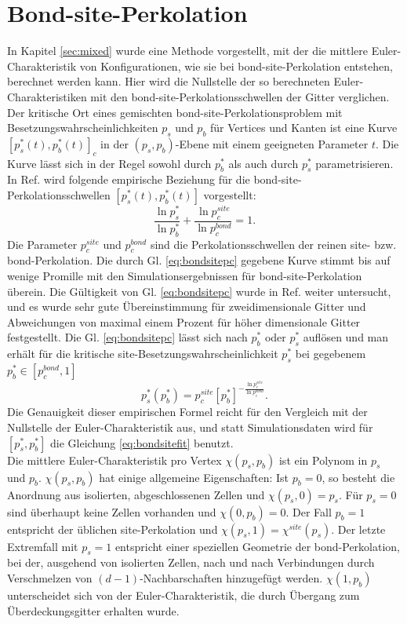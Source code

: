 \section{Bond-site-Perkolation}
In Kapitel \ref{sec:mixed} wurde eine Methode vorgestellt, mit der die mittlere Euler-Charakteristik von Konfigurationen, wie sie bei bond-site-Perkolation entstehen, berechnet werden kann. Hier wird die Nullstelle der so berechneten Euler-Charakteristiken mit den bond-site-Perkolationsschwellen der Gitter verglichen.
\\Der kritische Ort eines gemischten bond-site-Perkolationsproblem mit Besetzungswahrscheinlichkeiten $p_s$ und $p_b$ f\"ur Vertices und Kanten ist eine Kurve $[p_s^*(t),p_b^*(t)]_c$ in der $(p_s,p_b)$-Ebene mit einem geeigneten Parameter $t$. Die Kurve l\"asst sich in der Regel sowohl durch $p_b^*$ als auch durch $p_s^*$ parametrisieren. In Ref. \cite{Yanuka:90} wird folgende empirische Beziehung f\"ur die bond-site-Perkolationsschwellen $[p_s^*(t),p_b^*(t)]$ vorgestellt:
\begin{equation}
\label{eq:bondsitepc}
  \frac{\ln p^*_s}{\ln p^*_b}+\frac{\ln p_c^{site}}{\ln p_c^{bond}}=1.
\end{equation}
Die Parameter $p_c^{site}$ und $p_c^{bond}$ sind die Perkolationsschwellen der reinen site- bzw. bond-Perkolation. Die durch Gl. \ref{eq:bondsitepc} gegebene Kurve stimmt bis auf wenige Promille mit den Simulationsergebnissen f\"ur bond-site-Perkolation \"uberein. Die G\"ultigkeit von Gl. \ref{eq:bondsitepc} wurde in Ref. \cite{Tarasevich:99} weiter untersucht, und es wurde sehr gute \"Ubereinstimmung f\"ur zweidimensionale Gitter und Abweichungen von maximal einem Prozent f\"ur h\"oher dimensionale Gitter festgestellt. Die Gl. \ref{eq:bondsitepc} l\"asst sich nach $p^*_b$ oder $p^*_s$ aufl\"osen und man erh\"alt f\"ur die kritische site-Besetzungswahrscheinlichkeit $p^*_s$ bei gegebenem $p_b^*\in [p_c^{bond},1]$
\begin{equation}
\label{eq:bondsitefit}
p^*_s\left(p^*_b\right)=p_c^{site}\left[p^*_b\right]^{-\frac{\ln p_c^{site}}{\ln p_c^{bond}}}.
\end{equation}
Die Genauigkeit dieser empirischen Formel reicht f\"ur den Vergleich mit der Nullstelle der Euler-Charakteristik aus, und statt Simulationsdaten wird f\"ur $[p^*_s,p^*_b]$ die Gleichung \ref{eq:bondsitefit} benutzt.\\
Die mittlere Euler-Charakteristik pro Vertex $\chi(p_s,p_b)$ ist ein Polynom in $p_s$ und $p_b$. $\chi(p_s,p_b)$ hat einige allgemeine Eigenschaften: Ist $p_b=0$, so besteht die Anordnung aus isolierten, abgeschlossenen Zellen und $\chi(p_s,0)=p_s$. F\"ur $p_s=0$ sind \"uberhaupt keine Zellen vorhanden und $\chi(0,p_b)=0$. Der Fall $p_b=1$ entspricht der \"ublichen site-Perkolation und $\chi(p_s,1)=\chi^{site}(p_s)$. Der letzte Extremfall mit $p_s=1$ entspricht einer speziellen Geometrie der bond-Perkolation, bei der, ausgehend von isolierten Zellen, nach und nach Verbindungen durch Verschmelzen von $(d-1)$-Nachbarschaften hinzugef\"ugt werden. $\chi(1,p_b)$ unterscheidet sich von der Euler-Charakteristik, die durch \"Ubergang zum \"Uberdeckungsgitter erhalten wurde.
